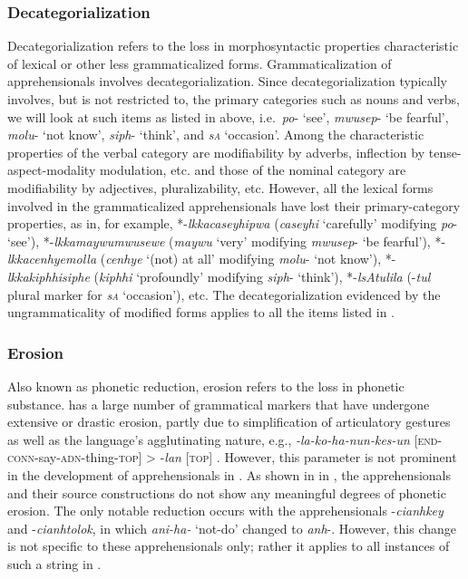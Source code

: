 \documentclass[output=paper,colorlinks,citecolor=brown]{langscibook}
\begin{document}
\subsubsection{Decategorialization}
\label{subsubsec:decategorialization}

Decategorialization refers to the loss in morphosyntactic properties characteristic of lexical or other less grammaticalized forms. Grammaticalization of apprehensionals involves decategorialization. Since decategorialization typically involves, but is not restricted to, the primary categories such as nouns and verbs, we will look at such items as listed in  above, i.e.\  \textit{po}- `see', \textit{mwusep}- `be fearful', \textit{molu}- `not know', \textit{siph}- `think', and \textit{s\textsc{a}} `occasion'. Among the characteristic properties of the verbal category are modifiability by adverbs, inflection by tense-aspect-modality modulation, etc. and those of the nominal category are modifiability by adjectives, pluralizability, etc. However, all the lexical forms involved in the grammaticalized apprehensionals have lost their primary-category properties, as in, for example, *-\textit{lkkacaseyhipwa} (\textit{caseyhi} `carefully' modifying \textit{po}- `see'), *-\textit{lkkamaywumwusewe} (\textit{maywu} `very' modifying \textit{mwusep}- `be fearful'),  *-\textit{lkkacenhyemolla} (\textit{cenhye} `(not) at all' modifying \textit{molu}- `not know'), *-\textit{lkkakiphhisiphe} (\textit{kiphhi} `profoundly' modifying \textit{siph}- `think'), *-\textit{lsAtulila} (-\textit{tul} plural marker for \textit{s\textsc{a}} `occasion'), etc. The decategorialization evidenced by the ungrammaticality of modified forms applies to all the items listed in .



\subsubsection{Erosion}
\label{subsubsec:erosion}

Also known as phonetic reduction, erosion refers to the loss in phonetic substance.  has a large number of grammatical markers that have undergone extensive or drastic erosion, partly due to simplification of articulatory gestures as well as the language's agglutinating nature, e.g., \textit{-la-ko-ha-nun-kes-un} [\textsc{end-conn}-say-\textsc{adn}-thing-\textsc{top}] > \nobreakdash-\textit{lan} [\textsc{top}] \citep[764]{Rhee2011}. However, this parameter is not prominent in the development of apprehensionals in . As shown in  in , the apprehensionals and their source constructions do not show any meaningful degrees of phonetic erosion. The only notable reduction occurs with the apprehensionals \nobreakdash-\textit{cianhkey} and \nobreakdash-\textit{cianhtolok}, in which \textit{ani-ha-} `not-do' changed to \textit{anh}-. However, this change is not specific to these apprehensionals only; rather it applies to all instances of such a string in . 
\end{document}

